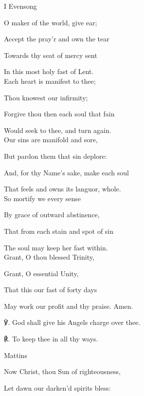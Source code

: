 \begin{paracol}{2}[]
\sloppy
\begin{inhead}
	I Evensong
\end{inhead}
\begin{hangparas}{1.25em}{1}
O maker of the world, give ear;

Accept the pray'r and own the tear

Towards thy seat of mercy sent

In this most holy fast of Lent.\\

Each heart is manifest to thee;

Thou knowest our infirmity;

Forgive thou then each soul that fain

Would seek to thee, and turn again.\\

Our sins are manifold and sore,

But pardon them that sin deplore:

And, for thy Name's sake, make each soul

That feels and owns its languor, whole.\\

So mortify we every sense

By grace of outward abstinence,

That from each stain and spot of sin

The soul may keep her fast within.\\

Grant, O thou blessed Trinity,

Grant, O essential Unity,

That this our fast of forty days

May work our profit and thy praise. Amen.\\

\end{hangparas}

℣. God shall give his Angels charge over thee.

℟. To keep thee in all thy ways.


\switchcolumn

\begin{inhead}
	Mattins
\end{inhead}
\begin{hangparas}{1.25em}{1}
Now Christ, thou Sun of righteousness,

Let dawn our darken'd spirits bless:


\end{hangparas}
\end{paracol}

